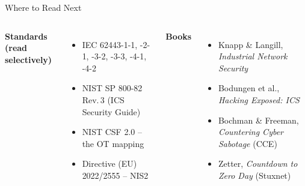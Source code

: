 \documentclass[aspectratio=169,11pt]{beamer}
\begin{document}
\begin{frame}{Where to Read Next}
\begin{columns}[T,onlytextwidth]
\textbf{Standards (read selectively)}
\begin{itemize}\setlength{\itemsep}{1pt}\scriptsize
  \item IEC 62443-1-1, -2-1, -3-2, -3-3, -4-1, -4-2
  \item NIST SP 800-82 Rev.\,3 (ICS Security Guide)
  \item NIST CSF 2.0 -- the OT mapping
  \item Directive (EU) 2022/2555 -- NIS2
\end{itemize}
\textbf{Books}
\begin{itemize}\setlength{\itemsep}{1pt}\scriptsize
  \item Knapp \& Langill, \emph{Industrial Network Security}
  \item Bodungen et al., \emph{Hacking Exposed: ICS}
  \item Bochman \& Freeman, \emph{Countering Cyber Sabotage} (CCE)
  \item Zetter, \emph{Countdown to Zero Day} (Stuxnet)
\end{itemize}


\end{columns}
\end{frame}
\end{document}
